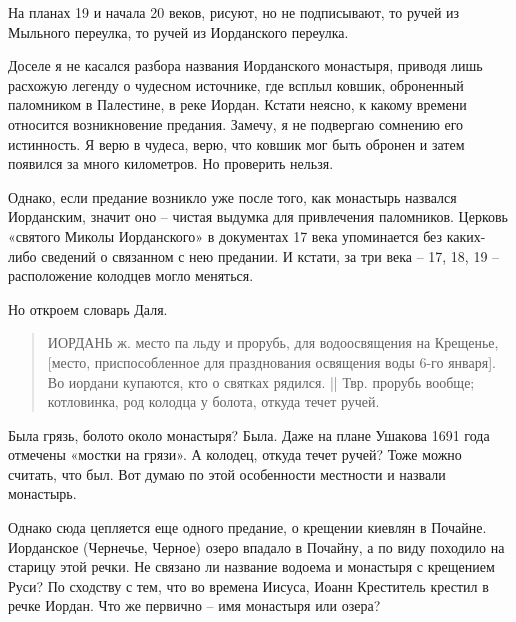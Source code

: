 На планах 19 и начала 20 веков, рисуют, но не подписывают, то ручей из Мыльного переулка, то ручей из Иорданского переулка. 

Доселе я не касался разбора названия Иорданского монастыря, приводя лишь расхожую легенду о чудесном источнике, где всплыл ковшик, оброненный паломником в Палестине, в реке Иордан. Кстати неясно, к какому времени относится возникновение предания. Замечу, я не подвергаю сомнению его истинность. Я верю в чудеса, верю, что ковшик мог быть обронен и затем появился за много километров. Но проверить нельзя. 

Однако, если предание возникло уже после того, как монастырь назвался Иорданским, значит оно – чистая выдумка для привлечения паломников. Церковь «святого Миколы Иорданского» в документах 17 века упоминается без каких-либо сведений о связанном с нею предании. И кстати, за три века – 17, 18, 19 – расположение колодцев могло меняться.

Но откроем словарь Даля.

\begin{quotation}
ИОРДАНЬ ж. место па льду и прорубь, для водоосвящения на Крещенье, [место, приспособленное для празднования освящения воды 6-го января]. Во иордани купаются, кто о святках  рядился. || Твр. прорубь вообще; котловинка, род колодца у болота, откуда течет ручей.
\end{quotation}

Была грязь, болото около монастыря? Была. Даже на плане Ушакова 1691 года отмечены «мостки на грязи». А колодец, откуда течет ручей? Тоже можно считать, что был. Вот думаю по этой особенности местности и назвали монастырь.


Однако сюда цепляется еще одного предание, о крещении киевлян в Почайне. Иорданское (Чернечье, Черное) озеро впадало в Почайну, а по виду походило на старицу этой речки. Не связано ли название водоема и монастыря с крещением Руси? По сходству с тем, что во времена Иисуса, Иоанн Креститель крестил в речке Иордан. Что же первично – имя монастыря или озера?
